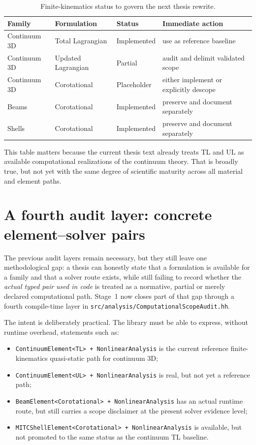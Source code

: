 \begin{table}[htbp]
  \centering
  \caption{Finite-kinematics status to govern the next thesis rewrite.}
  \label{tab:stage1-kinematics-status}
  \small
  \begin{tabular}{@{}llll@{}}
    \toprule
    \textbf{Family} & \textbf{Formulation} & \textbf{Status} & \textbf{Immediate action} \\
    \midrule
    Continuum 3D & Total Lagrangian & Implemented & use as reference baseline \\
    Continuum 3D & Updated Lagrangian & Partial & audit and delimit validated scope \\
    Continuum 3D & Corotational & Placeholder & either implement or explicitly descope \\
    Beams & Corotational & Implemented & preserve and document separately \\
    Shells & Corotational & Implemented & preserve and document separately \\
    \bottomrule
  \end{tabular}
\end{table}

This table matters because the current thesis text already treats TL and UL as
available computational realizations of the continuum theory.  That is broadly
true, but not yet with the same degree of scientific maturity across all
material and element paths.

\section{A fourth audit layer: concrete element--solver pairs}

The previous audit layers remain necessary, but they still leave one
methodological gap: a thesis can honestly state that a formulation is available
for a family and that a solver route exists, while still failing to record
whether the \emph{actual typed pair used in code} is treated as a normative,
partial or merely declared computational path.  Stage~1 now closes part of
that gap through a fourth compile-time layer in
\texttt{src/analysis/ComputationalScopeAudit.hh}.

The intent is deliberately practical.  The library must be able to express,
without runtime overhead, statements such as:
\begin{itemize}
  \item \texttt{ContinuumElement<TL> + NonlinearAnalysis} is the current
  reference finite-kinematics quasi-static path for continuum 3D;
  \item \texttt{ContinuumElement<UL> + NonlinearAnalysis} is real, but not yet
  a reference path;
  \item \texttt{BeamElement<Corotational> + NonlinearAnalysis} has an actual
  runtime route, but still carries a scope disclaimer at the present solver
  evidence level;
  \item \texttt{MITCShellElement<Corotational> + NonlinearAnalysis} is
  available, but not promoted to the same status as the continuum TL baseline.
\end{itemize}

